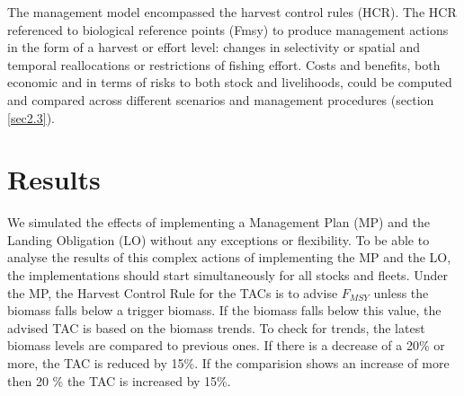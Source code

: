 \documentclass[12pt,oneline,a4paper,numbib]{ouparticle}
\numberwithin{equation}{subsection} %
\begin{document}



The management model encompassed the harvest control rules (HCR). The HCR referenced to biological reference points (Fmsy) to produce management actions in the form of a harvest or effort level: changes in selectivity or spatial and temporal reallocations or restrictions of fishing effort. Costs and benefits, both economic and in terms of risks to both stock and livelihoods, could be computed and compared across different scenarios and management procedures (section \ref{sec2.3}).




\section{Results}
\label{sec3}

We simulated the effects of implementing a Management Plan (MP) and the Landing Obligation (LO) without any exceptions or flexibility. To be able to analyse the results of this complex actions of implementing the MP and the LO, the implementations should start simultaneously for all stocks and fleets. Under the MP, the Harvest Control Rule for the TACs is to advise $F_{MSY}$ unless the biomass falls below a trigger biomass. If the biomass falls below this value, the advised TAC is based on the biomass trends. To check for trends, the latest biomass levels are compared to previous ones. If there is a decrease of a 20\% or more, the TAC is reduced by 15\%. If the comparision shows an increase of more then 20 \% the TAC is increased by 15\%.
\end{document}
